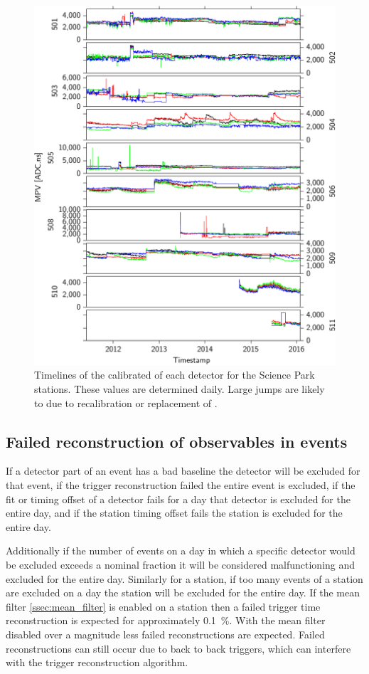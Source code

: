 \begin{figure}
    \centering
    \includegraphics[width=0.7\linewidth]{plots/dataset/mpv.pdf}
    \caption{Timelines of the calibrated \mpv of each detector for the Science Park stations. These values are determined daily. Large jumps are likely to due to recalibration or replacement of \pmts.}
    \label{fig:mpv}
\end{figure}


\subsection{Failed reconstruction of observables in events}

If a detector part of an event has a bad baseline the detector will be excluded for that event, if the trigger reconstruction failed the entire event is excluded, if the \mpv fit or timing offset of a detector fails for a day that detector is excluded for the entire day, and if the station timing offset fails the station is excluded for the entire day.

Additionally if the number of events on a day in which a specific detector would be excluded exceeds a nominal fraction it will be considered malfunctioning and excluded for the entire day. Similarly for a station, if too many events of a station are excluded on a day the station will be excluded for the entire day. If the mean filter \cref{ssec:mean_filter} is enabled on a station then a failed trigger time reconstruction is expected for approximately \SI{0.1}{\percent}. With the mean filter disabled over a magnitude less failed reconstructions are expected. Failed reconstructions can still occur due to back to back triggers, which can interfere with the trigger reconstruction algorithm.

